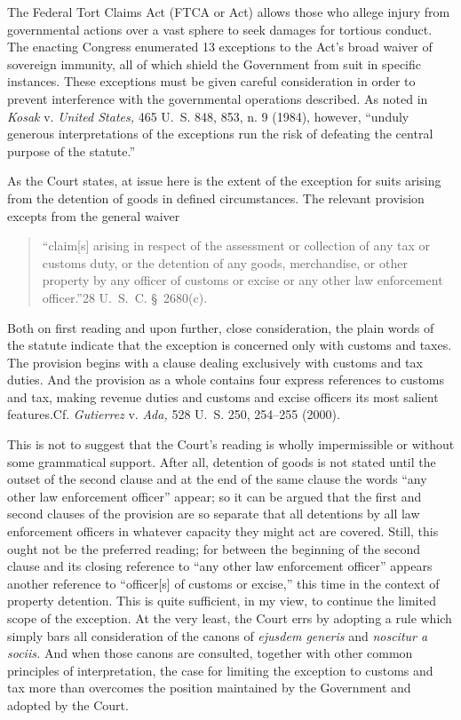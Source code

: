   The Federal Tort Claims Act (FTCA or Act) allows those who allege injury from governmental actions over a vast sphere to seek damages for tortious conduct. The enacting Congress enumerated 13 exceptions to the Act's broad waiver of sovereign immunity, all of which shield the Government from suit in specific instances. These exceptions must be given careful consideration in order to prevent interference with the governmental operations described. As noted in \emph{Kosak} v. \emph{United States,} 465 U.~S. 848, 853, n. 9 (1984), however, ``unduly generous interpretations of the ex\newpage ceptions run the risk of defeating the central purpose of the statute.''

  As the Court states, at issue here is the extent of the exception for suits arising from the detention of goods in defined circumstances. The relevant provision excepts from the general waiver

\begin{quote}

	``claim[s] arising in respect of the assessment or collection of any tax or customs duty, or the detention of any goods, merchandise, or other property by any officer of customs or excise or any other law enforcement officer.''28 U.~S.~C. \S~2680(c).

\end{quote}

  Both on first reading and upon further, close consideration, the plain words of the statute indicate that the exception is concerned only with customs and taxes. The provision begins with a clause dealing exclusively with customs and tax duties. And the provision as a whole contains four express references to customs and tax, making revenue duties and customs and excise officers its most salient features.Cf. \emph{Gutierrez} v. \emph{Ada,} 528 U.~S. 250, 254--255 (2000).

  This is not to suggest that the Court's reading is wholly impermissible or without some grammatical support. After all, detention of goods is not stated until the outset of the second clause and at the end of the same clause the words ``any other law enforcement officer'' appear; so it can be argued that the first and second clauses of the provision are so separate that all detentions by all law enforcement officers in whatever capacity they might act are covered. Still, this ought not be the preferred reading; for between the beginning of the second clause and its closing reference to ``any other law enforcement officer'' appears another reference to ``officer[s] of customs or excise,'' this time in the context of property detention. This is quite sufficient, in my view, to continue the limited scope of the exception. At the very least, the Court errs by adopting a rule which simply bars all consideration of the canons of \emph{ejusdem generis} and \emph{nosci\newpage tur a sociis.} And when those canons are consulted, together with other common principles of interpretation, the case for limiting the exception to customs and tax more than overcomes the position maintained by the Government and adopted by the Court.

